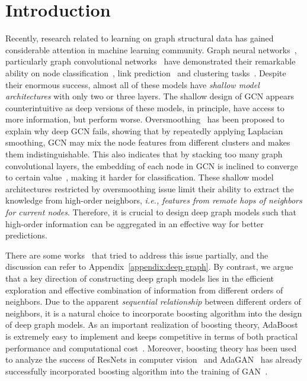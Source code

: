 \documentclass{article} \usepackage{iclr2021_conference,times}
\begin{document}
\section{Introduction}
Recently, research related to learning on graph structural data has gained considerable attention in machine learning community. Graph neural networks~\citep{gori2005new, hamilton2017inductive, velivckovic2017graph}, particularly graph convolutional networks~\citep{kipf2016semi,defferrard2016convolutional,bruna2013spectral} have demonstrated their remarkable ability on node classification~\citep{kipf2016semi}, link prediction~\citep{zhu2016max} and clustering tasks~\citep{fortunato2010community}. Despite their enormous success, almost all of these models have \emph{shallow model architectures} with only two or three layers. The shallow design of GCN appears counterintuitive as deep versions of these models, in principle, have access to more information, but perform worse.  Oversmoothing~\citep{li2018deeper} has been proposed to explain why deep GCN fails, showing that by repeatedly applying Laplacian smoothing, GCN may mix the node features from different clusters and makes them indistinguishable. This also indicates that by stacking too many graph convolutional layers, the embedding of each node in GCN is inclined to converge to certain value~\citep{li2018deeper}, making it harder for classification. These shallow model  architectures restricted by oversmoothing issue limit their ability to extract the knowledge from high-order neighbors, \textit{i.e., features from remote hops of neighbors for current nodes}. Therefore, it is crucial to design deep graph models such that high-order information can be aggregated in an effective way for better predictions.

There are some works~\citep{xu2018representation, liao2019lanczosnet, klicpera2018predict, li2019can,liu2020towards} that tried to address this issue partially, and the discussion can refer to Appendix~\ref{appendix:deep graph}. By contrast, we argue that a key direction of constructing deep graph models lies in the efficient exploration and effective combination of information from different orders of neighbors. Due to the apparent \textit{sequential relationship} between different orders of neighbors, it is a natural choice to incorporate boosting algorithm into the design of deep graph models. As an important realization of boosting theory, AdaBoost~\citep{freund1999short} is extremely easy to implement and keeps competitive in terms of both practical performance and computational cost~\citep{hastie2009multi}. Moreover, boosting theory has been used to analyze the success of ResNets in computer vision~\citep{huang2017learning} and AdaGAN~\citep{tolstikhin2017adagan} has already successfully incorporated boosting algorithm into the training of GAN~\citep{goodfellow2014generative}. 
\end{document}
